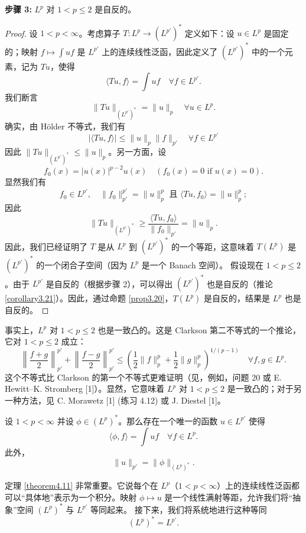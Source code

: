 \textbf{步骤 3:} $L^p$ 对 $1 < p \le 2$ 是自反的。
\begin{proof}
设 $1 < p < \infty$。考虑算子 $T: L^p \to (L^{p'})^*$ 定义如下：设 $u \in L^p$ 是固定的；映射 $f \mapsto \int uf$ 是 $L^{p'}$ 上的连续线性泛函，因此定义了 $(L^{p'})^*$ 中的一个元素，记为 $Tu$，使得
\[ \langle Tu, f \rangle = \int uf \quad \forall f \in L^{p'}. \]
我们断言
\begin{equation}\label{eq:lp_iso}
\|Tu\|_{(L^{p'})^*} = \|u\|_p \quad \forall u \in L^p.
\end{equation}
确实，由 Hölder 不等式，我们有
\[ |\langle Tu, f \rangle| \le \|u\|_p \|f\|_{p'} \quad \forall f \in L^{p'} \]
因此 $\|Tu\|_{(L^{p'})^*} \le \|u\|_p$。另一方面，设
\[ f_0(x) = |u(x)|^{p-2}u(x) \quad (f_0(x)=0 \text{ if } u(x)=0). \]
显然我们有
\[ f_0 \in L^{p'}, \quad \|f_0\|_{p'}^{p'} = \|u\|_p^p \text{ 且 } \langle Tu, f_0 \rangle = \|u\|_p^p; \]
因此
\begin{equation}\label{eq:lp_iso_2}
\|Tu\|_{(L^{p'})^*} \ge \frac{\langle Tu, f_0 \rangle}{\|f_0\|_{p'}} = \|u\|_p.
\end{equation}
因此，我们已经证明了 $T$ 是从 $L^p$ 到 $(L^{p'})^*$ 的一个等距，这意味着 $T(L^p)$ 是 $(L^{p'})^*$ 的一个闭合子空间（因为 $L^p$ 是一个 Banach 空间）。
假设现在 $1 < p \le 2$。由于 $L^{p'}$ 是自反的（根据步骤 2），可以得出 $(L^{p'})^*$ 也是自反的（推论 \ref{corollary3.21}）。因此，通过命题 \ref{prop3.20}，$T(L^p)$ 是自反的，结果是 $L^p$ 也是自反的。
\end{proof}
\begin{remark}
事实上，$L^p$ 对 $1 < p \le 2$ 也是一致凸的。这是 Clarkson 第二不等式的一个推论，它对 $1 < p \le 2$ 成立：
\[ \left\| \frac{f+g}{2} \right\|_{p'}^{p'} + \left\| \frac{f-g}{2} \right\|_{p'}^{p'} \le \left(\frac{1}{2}\|f\|_p^p + \frac{1}{2}\|g\|_p^p\right)^{1/(p-1)} \quad \forall f, g \in L^p. \]
这个不等式比 Clarkson 的第一个不等式更难证明（见，例如，问题 20 或 E. Hewitt–K. Stromberg [1]）。显然，它意味着 $L^p$ 对 $1 < p \le 2$ 是一致凸的；对于另一种方法，见 C. Morawetz [1] (练习 4.12) 或 J. Diestel [1]。
\end{remark}

\begin{theorem}\label{theorem4.11}
设 $1 < p < \infty$ 并设 $\phi \in (L^p)^*$。那么存在一个唯一的函数 $u \in L^{p'}$ 使得
\[ \langle \phi, f \rangle = \int uf \quad \forall f \in L^p. \]
此外，
\[ \|u\|_{p'} = \|\phi\|_{(L^p)^*}. \]
\end{theorem}
\begin{remark}
定理 \ref{theorem4.11} 非常重要。它说每个在 $L^p$（$1 < p < \infty$）上的连续线性泛函都可以“具体地”表示为一个积分。映射 $\phi \mapsto u$ 是一个线性满射等距，允许我们将“抽象”空间 $(L^p)^*$ 与 $L^{p'}$ 等同起来。
接下来，我们将系统地进行这种等同
\[ (L^p)^* = L^{p'}. \]
\end{remark}


